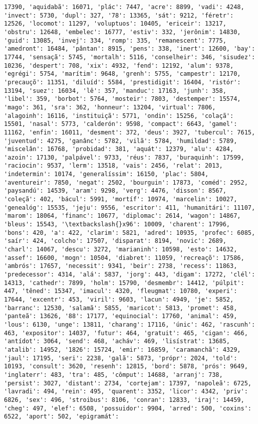 \begin{Verbatim}[commandchars=\\\{\}]
17390, 'aquidabã': 16071, 'plác': 7447, 'acre': 8899, 'vadi': 4248, 'invect': 5730, 'dupl': 327, '78': 13365, 'sát': 9212, 'féretr': 12526, 'locomot': 11297, 'voluptuos': 10405, 'ericeir': 13217, 'obstru': 12648, 'embelec': 16777, 'estiv': 332, 'jerônim': 14830, 'guid': 13085, 'invej': 334, 'romp': 335, 'remanescent': 7775, 'amedront': 16484, 'pântan': 8915, 'pens': 338, 'inert': 12600, 'bay': 17744, 'sensaçã': 5745, 'mortalh': 5116, 'conselheir': 346, 'sisudez': 10236, 'despert': 708, 'xix': 4932, 'fend': 12192, 'alum': 9378, 'egrégi': 5754, 'marítim': 9648, 'grenh': 5755, 'campestr': 12170, 'precauçõ': 11351, 'diluíd': 5584, 'prestidigit': 16404, 'ristór': 13194, 'suez': 16034, 'lê': 357, 'manduc': 17163, 'junh': 358, 'libel': 359, 'borbot': 5764, 'mosteir': 7803, 'destemper': 15574, 'mago': 361, 'sra': 362, 'honneur': 13204, 'virtual': 7806, 'alagoinh': 16116, 'instituiçã': 5771, 'ondin': 15256, 'colaçã': 15501, 'nasal': 5773, 'calderón': 9598, 'compact': 6643, 'gamel': 11162, 'enfin': 16011, 'desment': 372, 'deus': 3927, 'tubercul': 7615, 'juventud': 4275, 'ganânc': 5782, 'vilã': 5784, 'humildad': 5789, 'miscelân': 16768, 'probidad': 381, 'aquát': 12379, 'alu': 4284, 'azoin': 17130, 'palpável': 9733, 'réus': 7837, 'buraquinh': 17599, 'raciocin': 9537, 'lerm': 13518, 'vais': 2456, 'relat': 2013, 'indetermin': 10174, 'generalíssim': 16150, 'plac': 5804, 'aventureir': 7850, 'negat': 2502, 'bourguin': 17873, 'coméd': 2952, 'paysandú': 14539, 'aram': 9298, 'verg': 4476, 'disson': 8567, 'coleçã': 402, 'bácul': 5991, 'mortíf': 10974, 'marcelin': 10027, 'genealóg': 15535, 'jeju': 9556, 'escritor': 411, 'humanitári': 11107, 'marom': 18064, 'financ': 10677, 'diplomac': 2614, 'wagon': 14867, 'bleus': 15543, '\textbackslash{}x96': 10009, 'charent': 17996, 'bons': 420, 'a': 422, 'clarim': 5821, 'adred': 10935, 'profec': 6085, 'saír': 424, 'colcho': 17507, 'disparat': 8194, 'novic': 2689, 'charl': 14067, 'descu': 3272, 'marianinh': 10598, 'esto': 14632, 'assef': 16600, 'mogn': 10504, 'diabret': 11059, 'recreaçõ': 17586, 'ambrós': 17657, 'necessit': 9341, 'beir': 2738, 'recess': 11863, 'predecessor': 4314, 'alá': 5837, 'jorg': 443, 'digam': 17272, 'clél': 14313, 'cathedr': 7899, 'holm': 15790, 'desmembr': 14412, 'púlpit': 447, 'têned': 15347, 'imacul': 4320, 'fleugmat': 10780, 'experi': 17644, 'excentr': 453, 'viril': 9603, 'lacun': 4949, 'je': 5852, 'barranc': 12530, 'salamã': 5855, 'maricot': 5813, 'promet': 458, 'panteã': 13626, '88': 17177, 'equinocial': 17760, 'animal': 459, 'lous': 6130, 'unge': 13811, 'charang': 17116, 'únic': 462, 'rascunh': 463, 'expositor': 14037, 'futur': 464, 'gratuit': 465, 'cigan': 466, 'antídot': 3064, 'send': 468, 'acháv': 469, 'lisístrat': 13685, 'atalib': 14952, '1826': 15724, 'emir': 16859, 'caramanchã': 4329, 'jaul': 17195, 'seri': 2238, 'galã': 5873, 'própr': 2024, 'told': 10193, 'consult': 3620, 'resenh': 12815, 'bord': 5878, 'prós': 9649, 'inglaterr': 483, 'tra': 485, 'cômput': 14688, 'arranj': 738, 'persist': 3027, 'distant': 2734, 'cortejam': 17397, 'napoleã': 6725, 'lavradi': 494, 'rein': 495, 'quarent': 3352, 'licor': 4342, 'priv': 6826, 'sex': 496, 'stroibus': 8106, 'conran': 12833, 'iraj': 14459, 'cheg': 497, 'elef': 6508, 'possuidor': 9904, 'arred': 500, 'coxins': 6522, 'aport': 502, 'epigramát': 
\end{Verbatim}
